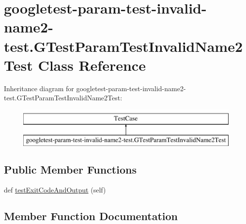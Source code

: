 \hypertarget{classgoogletest-param-test-invalid-name2-test_1_1GTestParamTestInvalidName2Test}{}\section{googletest-\/param-\/test-\/invalid-\/name2-\/test.G\+Test\+Param\+Test\+Invalid\+Name2\+Test Class Reference}
\label{classgoogletest-param-test-invalid-name2-test_1_1GTestParamTestInvalidName2Test}
Inheritance diagram for googletest-\/param-\/test-\/invalid-\/name2-\/test.G\+Test\+Param\+Test\+Invalid\+Name2\+Test\+:\begin{figure}[H]
\begin{center}
\leavevmode
\includegraphics[height=2.000000cm]{classgoogletest-param-test-invalid-name2-test_1_1GTestParamTestInvalidName2Test}
\end{center}
\end{figure}
\subsection*{Public Member Functions}
\begin{DoxyCompactItemize}
\item 
def \mbox{\hyperlink{classgoogletest-param-test-invalid-name2-test_1_1GTestParamTestInvalidName2Test_a3fbc22a46315dc7ba10f0203349de7c7}{test\+Exit\+Code\+And\+Output}} (self)
\end{DoxyCompactItemize}


\subsection{Member Function Documentation}
\mbox{\label{classgoogletest-param-test-invalid-name2-test_1_1GTestParamTestInvalidName2Test_a3fbc22a46315dc7ba10f0203349de7c7}} 
